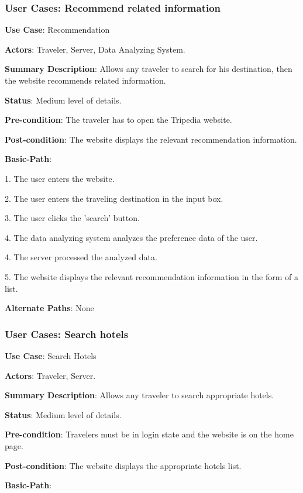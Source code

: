\documentclass[conference]{IEEEtran}
\begin{document}
\subsubsection{User Cases: Recommend related information}

\textbf{ }

\textbf{Use Case}: Recommendation

\textbf{Actors}: Traveler, Server, Data Analyzing System.

\textbf{Summary Description}: Allows any traveler to search for his destination, then the website recommends related information.

\textbf{Status}: Medium level of details.

\textbf{Pre-condition}: The traveler has to open the Tripedia website.

\textbf{Post-condition}: The website displays the relevant recommendation information.

\textbf{Basic-Path}:

1. The user enters the website.

2. The user enters the traveling destination in the input box.

3. The user clicks the 'search' button.

4. The data analyzing system analyzes the preference data of the user.

4. The server processed the analyzed data.

5. The website displays the relevant recommendation information in the form of a list.

\textbf{Alternate Paths}:  None

\subsubsection{User Cases: Search hotels}

\textbf{ }

\textbf{Use Case}: Search Hotels

\textbf{Actors}: Traveler, Server.

\textbf{Summary Description}: Allows any traveler to search appropriate hotels.

\textbf{Status}: Medium level of details.

\textbf{Pre-condition}: Travelers must be in login state and the website is on the home page.

\textbf{Post-condition}: The website displays the appropriate hotels list.

\textbf{Basic-Path}:
\end{document}
